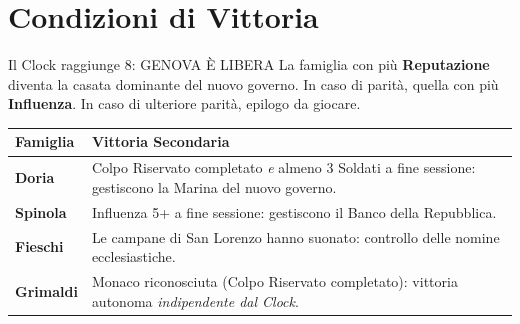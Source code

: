 \section{Condizioni di Vittoria}
\label{sec:vittoria}


\begin{rulebox}[GoldRPG]{Il Clock raggiunge 8: GENOVA È LIBERA}
La famiglia con più \textbf{Reputazione} diventa la casata dominante
del nuovo governo. In caso di parità, quella con più \textbf{Influenza}.
In caso di ulteriore parità, epilogo da giocare.
\end{rulebox}

\medskip

\begin{center}
\begin{tabular}{L{2.5cm} p{11cm}}
  \toprule
  \textbf{Famiglia} & \textbf{Vittoria Secondaria} \\
  \midrule
  \textbf{Doria}    & Colpo Riservato completato \textit{e} almeno 3 Soldati a fine sessione:
                      gestiscono la Marina del nuovo governo. \\
  \textbf{Spinola}  & Influenza 5+ a fine sessione: gestiscono il Banco della Repubblica. \\
  \textbf{Fieschi}  & Le campane di San Lorenzo hanno suonato: controllo delle nomine ecclesiastiche. \\
  \textbf{Grimaldi} & Monaco riconosciuta (Colpo Riservato completato): vittoria autonoma
                      \textit{indipendente dal Clock}. \\
  \bottomrule
\end{tabular}
\end{center}
